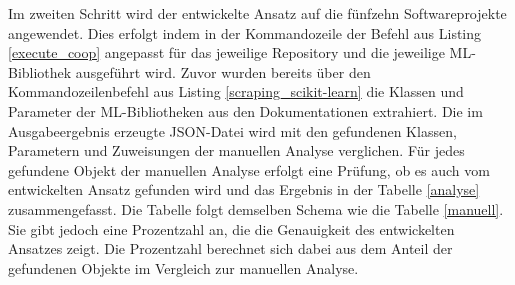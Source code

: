 \documentclass[german,bachelor]{swsLeipzig}
\begin{document}
\noindent Im zweiten Schritt wird der entwickelte Ansatz auf die fünfzehn Softwareprojekte angewendet.
Dies erfolgt indem in der Kommandozeile der Befehl aus Listing \ref{execute_coop} angepasst für das jeweilige Repository und die
jeweilige ML-Bibliothek ausgeführt wird.
Zuvor wurden bereits über den Kommandozeilenbefehl aus Listing \ref{scraping_scikit-learn} die Klassen und Parameter
der ML-Bibliotheken aus den Dokumentationen extrahiert.
Die im Ausgabeergebnis erzeugte JSON-Datei wird mit den gefundenen Klassen, Parametern und Zuweisungen der manuellen
Analyse verglichen.
Für jedes gefundene Objekt der manuellen Analyse erfolgt eine Prüfung, ob es auch vom entwickelten Ansatz gefunden wird und
das Ergebnis in der Tabelle \ref{analyse} zusammengefasst.
Die Tabelle folgt demselben Schema wie die Tabelle \ref{manuell}.
Sie gibt jedoch eine Prozentzahl an, die die Genauigkeit des entwickelten Ansatzes zeigt.
Die Prozentzahl berechnet sich dabei aus dem Anteil der gefundenen Objekte im Vergleich zur manuellen Analyse.
\end{document}
